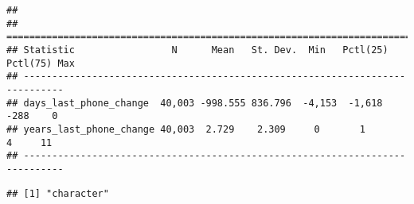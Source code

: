 \documentclass[
]{article}
\newenvironment{Shaded}{\begin{snugshade}}{\end{snugshade}}
\newcommand{\CommentTok}[1]{\textcolor[rgb]{0.56,0.35,0.01}{\textit{#1}}}
\newcommand{\DecValTok}[1]{\textcolor[rgb]{0.00,0.00,0.81}{#1}}
\newcommand{\FunctionTok}[1]{\textcolor[rgb]{0.00,0.00,0.00}{#1}}
\newcommand{\NormalTok}[1]{#1}
\newcommand{\OtherTok}[1]{\textcolor[rgb]{0.56,0.35,0.01}{#1}}
\newcommand{\SpecialCharTok}[1]{\textcolor[rgb]{0.00,0.00,0.00}{#1}}
\newcommand{\StringTok}[1]{\textcolor[rgb]{0.31,0.60,0.02}{#1}}
\begin{document}
\begin{verbatim}
## 
## =============================================================================
## Statistic                 N      Mean   St. Dev.  Min   Pctl(25) Pctl(75) Max
## -----------------------------------------------------------------------------
## days_last_phone_change  40,003 -998.555 836.796  -4,153  -1,618    -288    0 
## years_last_phone_change 40,003  2.729    2.309     0       1        4     11 
## -----------------------------------------------------------------------------
\end{verbatim}

\begin{Shaded}
\end{Shaded}

\begin{verbatim}
## [1] "character"
\end{verbatim}

\begin{Shaded}
\end{Shaded}
\end{document}
